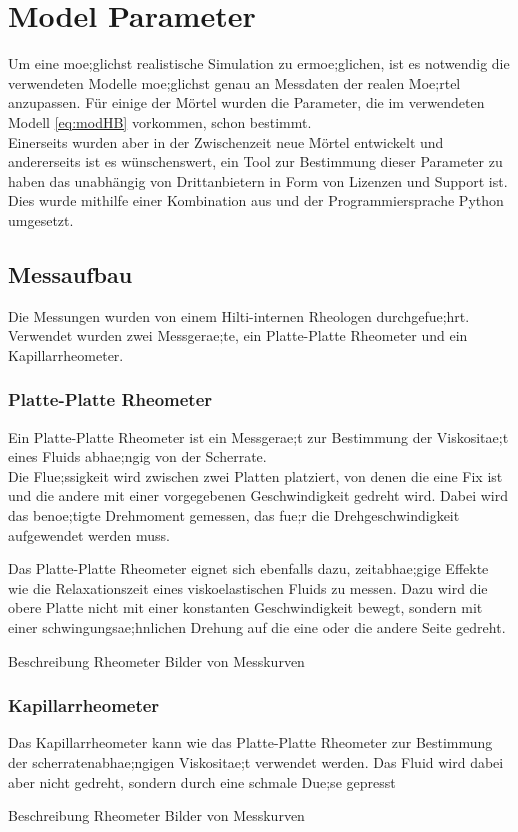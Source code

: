 \section{Model Parameter}
\label{Kapitel:Parameter}
Um eine moe;glichst realistische Simulation zu ermoe;glichen, ist es notwendig die verwendeten Modelle moe;glichst genau an Messdaten der realen Moe;rtel anzupassen.
Für einige der Mörtel wurden die Parameter, die im verwendeten Modell \eqref{eq:modHB} vorkommen, schon bestimmt. \\
Einerseits wurden aber in der Zwischenzeit neue Mörtel entwickelt und andererseits ist es wünschenswert, ein Tool zur Bestimmung dieser Parameter zu haben das unabhängig von Drittanbietern in Form von Lizenzen und Support ist. \\
Dies wurde mithilfe einer Kombination aus \openfoam{} und der Programmiersprache Python umgesetzt.
%
\subsection{Messaufbau}
Die Messungen wurden von einem Hilti-internen Rheologen durchgefue;hrt. Verwendet wurden zwei Messgerae;te, ein Platte-Platte Rheometer und ein Kapillarrheometer.
%
\subsubsection{Platte-Platte Rheometer}
\label{Kapitel:Parameter:PlattePlatteRheo}
Ein Platte-Platte Rheometer ist ein Messgerae;t zur Bestimmung der Viskositae;t eines Fluids abhae;ngig von der Scherrate.\\
Die Flue;ssigkeit wird zwischen zwei Platten platziert, von denen die eine Fix ist und die andere mit einer vorgegebenen Geschwindigkeit gedreht wird.
Dabei wird das benoe;tigte Drehmoment gemessen, das fue;r die Drehgeschwindigkeit aufgewendet werden muss.

Das Platte-Platte Rheometer eignet sich ebenfalls dazu, zeitabhae;gige Effekte wie die Relaxationszeit eines viskoelastischen Fluids zu messen. 
Dazu wird die obere Platte nicht mit einer konstanten Geschwindigkeit bewegt, sondern mit einer schwingungsae;hnlichen Drehung auf die eine oder die andere Seite gedreht.
%
\begin{todocontent}
    \1 Beschreibung Rheometer
    \1 Bilder von Messkurven
\end{todocontent}
%
\subsubsection{Kapillarrheometer}
Das Kapillarrheometer kann wie das Platte-Platte Rheometer zur Bestimmung der scherratenabhae;ngigen Viskositae;t verwendet werden. Das Fluid wird dabei aber nicht gedreht, sondern durch eine schmale Due;se gepresst
\begin{todocontent}
    \1 Beschreibung Rheometer
    \1 Bilder von Messkurven
\end{todocontent}
%
